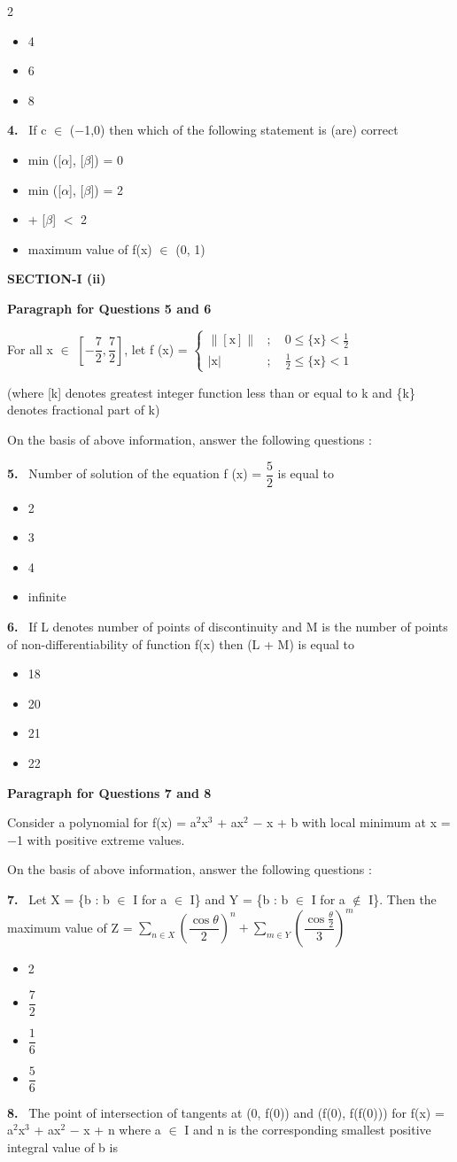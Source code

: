 \documentclass[10pt]{extarticle}
\newcommand{\sect}[1]{\par\smallskip\noindent\textbf{#1}\par}
\newcommand{\qn}[1]{\par\smallskip\noindent\textbf{#1.}~}
\newcommand{\paraq}[2]{\par\smallskip\noindent\textbf{Paragraph for Questions #1 and #2}\par}
\newenvironment{qoptions}{\begin{itemize}[leftmargin=1.8em,itemsep=1pt,topsep=2pt,label={}]}{\end{itemize}}
\newcommand{\opt}[2]{\item[(#1)] #2}
\begin{document}
\begin{multicols}{2}
\begin{qoptions}
\opt{B}{4}
\opt{C}{6}
\opt{D}{8}
\end{qoptions}
\qn{4} If c $\in$ ($-$1,0) then which of the following statement is (are) correct
\begin{qoptions}
\opt{A}{min ([$\alpha$], [$\beta$]) = 0}
\opt{B}{min ([$\alpha$], [$\beta$]) = 2}
\opt{C}{[$\alpha$] + [$\beta$] $<$ 2}
\opt{D}{maximum value of f(x) $\in$ (0, 1)}
\end{qoptions}
\sect{SECTION-I (ii)}
\paraq{5}{6}For all x $\in$ $\left[-\dfrac{7}{2},\dfrac{7}{2}\right]$, let f (x) = $\begin{cases}\|[\text{x}]\| & ;\quad 0\leq\{\text{x}\}<\frac{1}{2}\\ |\text{x}| & ;\quad \frac{1}{2}\leq\{\text{x}\}<1\end{cases}$\par
(where [k] denotes greatest integer function less than or equal to k and \{k\} denotes fractional part of k)\par
On the basis of above information, answer the following questions :\par
\qn{5} Number of solution of the equation f (x) = $\dfrac{5}{2}$ is equal to
\begin{qoptions}
\opt{A}{2}
\opt{B}{3}
\opt{C}{4}
\opt{D}{infinite}
\end{qoptions}
\qn{6} If L denotes number of points of discontinuity and M is the number of points of non-differentiability of function f(x) then (L + M) is equal to
\begin{qoptions}
\opt{A}{18}
\opt{B}{20}
\opt{C}{21}
\opt{D}{22}
\end{qoptions}
\paraq{7}{8}Consider a polynomial for f(x) = a$^2$x$^3$ + ax$^2$ $-$ x + b with local minimum at x = $-$1 with positive extreme values.\par
On the basis of above information, answer the following questions :\par
\qn{7} Let X = \{b : b $\in$ I for a $\in$ I\} and Y = \{b : b $\in$ I for a $\notin$ I\}. Then the maximum value of Z = $\displaystyle\sum_{n\in X}\left(\dfrac{\cos\theta}{2}\right)^n+\sum_{m\in Y}\left(\dfrac{\cos\frac{\theta}{2}}{3}\right)^m$
\begin{qoptions}
\opt{A}{2}
\opt{B}{$\dfrac{7}{2}$}
\opt{C}{$\dfrac{1}{6}$}
\opt{D}{$\dfrac{5}{6}$}
\end{qoptions}
\qn{8} The point of intersection of tangents at (0, f(0)) and (f(0), f(f(0))) for f(x) = a$^2$x$^3$ + ax$^2$ $-$ x + n where a $\in$ I and n is the corresponding smallest positive integral value of b is
\begin{qoptions}

\end{qoptions}
\end{multicols}
\end{document}
